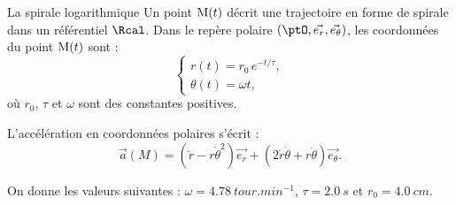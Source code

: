 \begin{exo}[PC][2][TD]{La spirale logarithmique}
  Un point ${\rm M}(t)$ décrit une trajectoire en forme de spirale dans un référentiel $\Rcal$.
  Dans le repère polaire $(\ptO, \Vec{e_r}, \Vec{e_\theta})$, les coordonnées du point ${\rm M}(t)$ sont :
  \begin{equation}
    \begin{cases}
      r(t) = r_0\, e^{-t/\tau},\\
      \theta(t)  = \omega t,
    \end{cases}
  \end{equation}
  où $r_0$, $\tau$ et $\omega$ sont des constantes positives.

  \begin{quest}
     

  \end{quest}
  L'accélération en coordonnées polaires s'écrit :
  \begin{equation}
    \Vec{a}(M)=\left(\ddot{r}-r\dot{\theta}^2\right) \Vec{e_r}+\left(2\dot{r}\dot{\theta}+r\ddot{\theta}\right) \Vec{e_\theta}.
  \end{equation}
\begin{quest}
   
\end{quest}
  On donne les valeurs suivantes :
  $\omega=\SI{4,78}{tour.min^{-1}}$,  $\tau=\SI{2,0}{s}$ et $r_0=\SI{4,0}{cm}$.

  \begin{quest}
     
\end{quest}
\end{exo}
